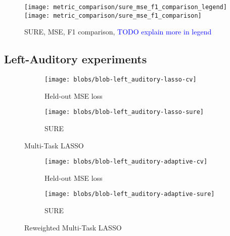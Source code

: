 \begin{figure}[h]
    \centering
    \texttt{[image: metric\_comparison/sure\_mse\_f1\_comparison\_legend]}
    \texttt{[image: metric\_comparison/sure\_mse\_f1\_comparison]}
    \caption{SURE, MSE, F1 comparison, \textcolor{blue}{TODO explain more in legend}}
    \label{fig:sure_mse_f1_comparison}
\end{figure}

\subsection{Left-Auditory experiments}


\begin{figure}
    \centering
    \begin{subfigure}[t]{0.4\textwidth}
        \centering
        \texttt{[image: blobs/blob-left\_auditory-lasso-cv]}
        \caption{Held-out MSE loss}
        \label{subfig:left_auditory_lasso_cv}
    \end{subfigure}
    \hfill
    \begin{subfigure}[t]{0.4\textwidth}
        \centering
        \texttt{[image: blobs/blob-left\_auditory-lasso-sure]}
        \caption{SURE}
        \label{subfig:left_auditory_lasso_sure}
    \end{subfigure}

    \caption{Multi-Task LASSO}
\end{figure}

\begin{figure}
    \centering
    \begin{subfigure}[t]{0.4\textwidth}
        \centering
        \texttt{[image: blobs/blob-left\_auditory-adaptive-cv]}
        \caption{Held-out MSE loss}
        \label{subfig:left_auditory_adaptive_cv}
    \end{subfigure}
    \hfill
    \begin{subfigure}[t]{0.4\textwidth}
        \centering
        \texttt{[image: blobs/blob-left\_auditory-adaptive-sure]}
        \caption{SURE}
        \label{subfig:left_auditory_adaptive_sure}
    \end{subfigure}

    \caption{Reweighted Multi-Task LASSO}
\end{figure}

